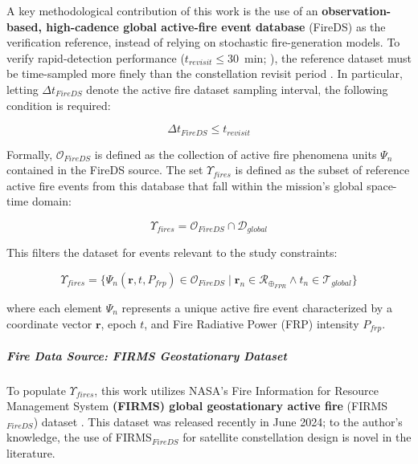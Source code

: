 \begin{table}[ht]
{A key methodological contribution of this work is the use of an \textbf{observation-based, high-cadence global active-fire event database} (FireDS) as the verification reference, instead of relying on stochastic fire-generation models. To verify rapid-detection performance ($t_{revisit} \leq 30$~min; ), the reference dataset must be time-sampled more finely than the constellation revisit period . In particular, letting $\Delta t_{FireDS}$ denote the active fire dataset sampling interval, the following condition is required:

\begin{equation}

    \Delta t_{FireDS} \leq t_{revisit}

\end{equation}

Formally, $\mathcal{O}_{FireDS}$ is defined as the collection of active fire phenomena units $\Psi_n$ contained in the FireDS source. The set $\Upsilon_{fires}$ is defined as the subset of reference active fire events from this database that fall within the mission's global space-time domain:

\begin{equation}

    \Upsilon_{fires} = \mathcal{O}_{FireDS} \cap \mathcal{D}_{global}

\end{equation}

This filters the dataset for events relevant to the study constraints:

\begin{equation}

    \Upsilon_{fires} = \{ \Psi_n(\mathbf{r}, t, P_{frp}) \in \mathcal{O}_{FireDS} \mid \mathbf{r}_n \in \mathcal{R}_{\oplus_{FPR}} \wedge t_n \in \mathcal{T}_{global} \}

\end{equation}

where each element $\Psi_n$ represents a unique active fire event characterized by a coordinate vector $\mathbf{r}$, epoch $t$, and Fire Radiative Power (FRP) intensity $P_{frp}$.



\subparagraph{Fire Data Source: FIRMS Geostationary Dataset} \hspace{0pt}

\label{sec:firms_dataset}

To populate $\Upsilon_{fires}$, this work utilizes NASA's Fire Information for Resource Management System \textbf{(FIRMS) global geostationary active fire} (FIRMS$_{FireDS}$) dataset \cite{davies_geostationary_2024}. This dataset was released recently in June 2024; to the author's knowledge, the use of FIRMS$_{FireDS}$ for satellite constellation design is novel in the literature. 



}
\end{table}
